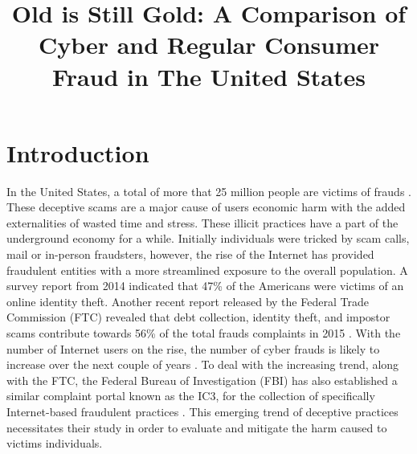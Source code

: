 \documentclass[conference]{IEEEtran}
\begin{document}
\title{Old is Still Gold: A Comparison of Cyber and Regular Consumer Fraud in The United States}


\author{
}

\maketitle

\begin{abstract}

\lipsum[1-2]
\end{abstract}


\section{Introduction}

In the United States, a total of more that 25 million people are victims of frauds \cite{ftcfraud}. These deceptive scams are a major cause of users economic harm with the added externalities of wasted time and stress. These illicit practices have a part of the underground economy for a while. Initially individuals were tricked by scam calls, mail or in-person fraudsters, however, the rise of the Internet has provided fraudulent entities with a more streamlined exposure to the overall population. A  survey report from 2014 indicated that 47\% of the Americans were victims of an online identity theft. Another recent report released by the  Federal Trade Commission (FTC) revealed that debt collection, identity theft, and impostor scams contribute towards 56\% of the total frauds complaints in 2015 \cite{ftc2015} . With the number of Internet users on the rise, the number of cyber frauds is likely to increase over the next couple of years \cite{pewinternet}. To deal with the increasing trend, along with the FTC, the Federal Bureau of Investigation (FBI) has also established a similar complaint portal known as the IC3, for the collection of specifically Internet-based fraudulent practices \cite{fbiic3}. This emerging trend of deceptive practices necessitates their study in order to evaluate and mitigate the harm caused to victims individuals.
\end{document}
